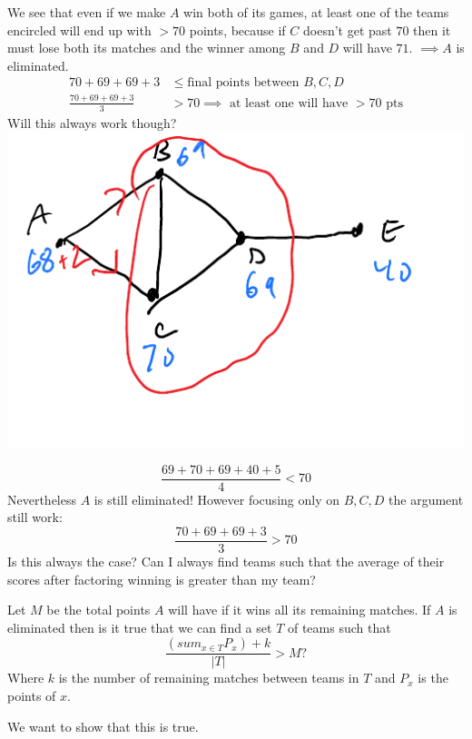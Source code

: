 \documentclass[12 pt]{article}
\begin{document}
        We see that even if we make $A$ win both of its games, at
        least one of the teams encircled will end up with $>70$
        points, because if $C$ doesn't get past $70$ then it must lose
        both its matches and the winner among $B$ and $D$ will have
        $71$. $\implies A$ is eliminated.
        \begin{align*}
          70 + 69 + 69 + 3 & \leq \text{final points between }B,C,D
          \\ \frac{70+69+69+3}{3} & > 70 \implies \text{ at least one
                                    will have $> 70$ pts}
        \end{align*}
        Will this always work though?
        \\ \includegraphics[width=.9\textwidth]{i85.pdf}

        $$\frac{69+70+69+40+5}{4} < 70$$
        Nevertheless $A$ is still eliminated! However focusing only on
        $B,C,D$ the argument still work:
        $$\frac{70 +  69 + 69 + 3}{3} > 70$$
        Is this always the case? Can I always find teams such that the
        average of their scores after factoring winning is greater
        than my team?

        Let $M$ be the total points $A$ will have if it wins all its
        remaining matches. If $A$ is eliminated then is it true that
        we can find a set $T$ of teams such that
        $$\dfrac{\left(sum_{x \in T}P_x\right) + k}{|T|}>M?$$
        Where $k$ is the number of remaining matches between teams in
        $T$ and $P_x$ is the points of $x$.

        We want to show that this is true.
\end{document}
